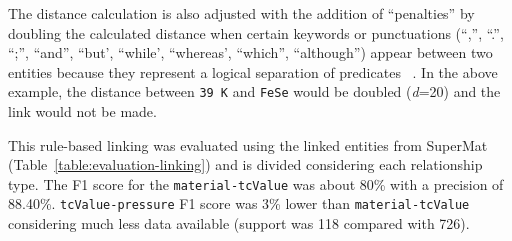 \documentclass[]{interact}
\theoremstyle{plain}%
\theoremstyle{definition}
\theoremstyle{remark}
\newcommand{\tc}{T$_{c}$}
\begin{document}
The distance calculation is also adjusted with the addition of ``penalties'' by doubling the calculated distance when certain keywords or punctuations (``,'', ``.'', ``;'', ``and'', ``but', ``while', ``whereas', ``which'', ``although'') appear between two entities because they represent a logical separation of predicates ~\cite{oka2021table}.
In the above example, the distance between \texttt{39 K} and \texttt{FeSe} would be doubled (\textit{d}=20) and the link would not be made.

This rule-based linking was evaluated using the linked entities from SuperMat~\cite{foppiano2021supermat} (Table~\ref{table:evaluation-linking}) and is divided considering each relationship type.
The F1 score for the \texttt{material-tcValue} was about 80\% with a precision of 88.40\%. 
\texttt{tcValue-pressure} F1 score was 3\% lower than  \texttt{material-tcValue} considering much less data available (support was 118 compared with 726).

\begin{table}[ht]
    \centering
    \label{table:evaluation-linking}
\end{table}
\end{document}
